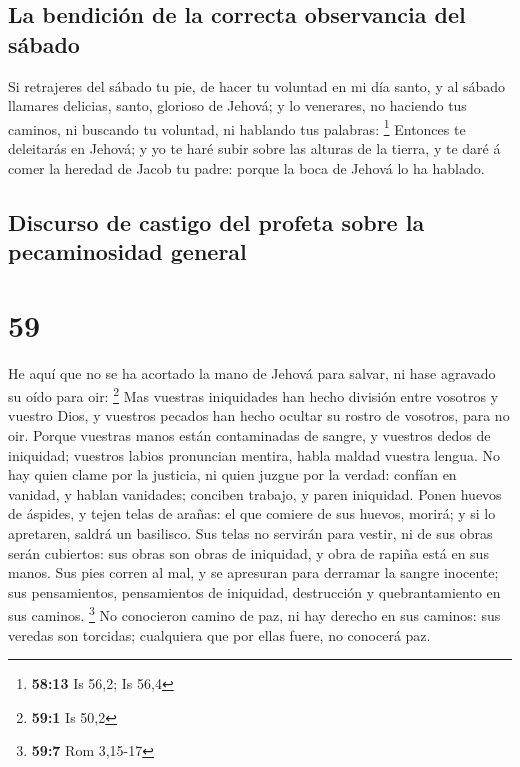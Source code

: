 \hypertarget{la-bendiciuxf3n-de-la-correcta-observancia-del-suxe1bado}{%
\subsection{La bendición de la correcta observancia del
sábado}\label{la-bendiciuxf3n-de-la-correcta-observancia-del-suxe1bado}}

 Si retrajeres del sábado tu pie, de hacer tu voluntad en
mi día santo, y al sábado llamares delicias, santo, glorioso de Jehová;
y lo venerares, no haciendo tus caminos, ni buscando tu voluntad, ni
hablando tus palabras: \footnote{\textbf{58:13} Is 56,2; Is 56,4}
 Entonces te deleitarás en Jehová; y yo te haré subir
sobre las alturas de la tierra, y te daré á comer la heredad de Jacob tu
padre: porque la boca de Jehová lo ha hablado.

\hypertarget{discurso-de-castigo-del-profeta-sobre-la-pecaminosidad-general}{%
\subsection{Discurso de castigo del profeta sobre la pecaminosidad
general}\label{discurso-de-castigo-del-profeta-sobre-la-pecaminosidad-general}}

\hypertarget{section-58}{%
\section{59}\label{section-58}}

 He aquí que no se ha acortado la mano de Jehová para
salvar, ni hase agravado su oído para oir: \footnote{\textbf{59:1} Is
  50,2}  Mas vuestras iniquidades han hecho división entre
vosotros y vuestro Dios, y vuestros pecados han hecho ocultar su rostro
de vosotros, para no oir.  Porque vuestras manos están
contaminadas de sangre, y vuestros dedos de iniquidad; vuestros labios
pronuncian mentira, habla maldad vuestra lengua.  No hay
quien clame por la justicia, ni quien juzgue por la verdad: confían en
vanidad, y hablan vanidades; conciben trabajo, y paren iniquidad.
 Ponen huevos de áspides, y tejen telas de arañas: el que
comiere de sus huevos, morirá; y si lo apretaren, saldrá un basilisco.
 Sus telas no servirán para vestir, ni de sus obras serán
cubiertos: sus obras son obras de iniquidad, y obra de rapiña está en
sus manos.  Sus pies corren al mal, y se apresuran para
derramar la sangre inocente; sus pensamientos, pensamientos de
iniquidad, destrucción y quebrantamiento en sus caminos. \footnote{\textbf{59:7}
  Rom 3,15-17}  No conocieron camino de paz, ni hay
derecho en sus caminos: sus veredas son torcidas; cualquiera que por
ellas fuere, no conocerá paz.

